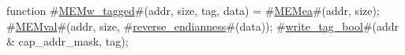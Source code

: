 function #\hyperref[zMEMwzytagged]{MEMw\_tagged}#(addr, size, tag, data) =
{
  #\hyperref[zMEMea]{MEMea}#(addr, size);
  #\hyperref[zMEMval]{MEMval}#(addr, size, #\hyperref[zreversezyendianness]{reverse\_endianness}#(data));
  #\hyperref[zwritezytagzybool]{write\_tag\_bool}#(addr & cap_addr_mask, tag);
}
